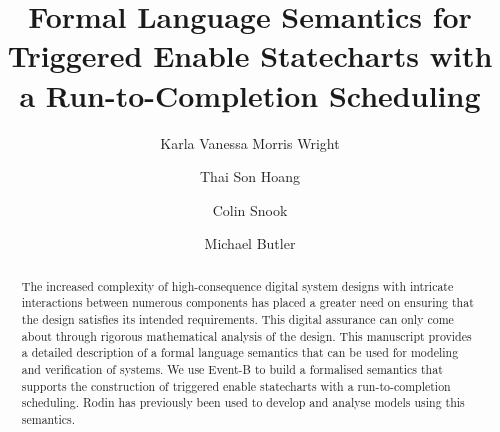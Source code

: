 \documentclass[runningheads]{llncs}
\begin{document}
%
\title{Formal Language Semantics for Triggered Enable Statecharts with a Run-to-Completion Scheduling}
%
%
\author{
Karla Vanessa Morris Wright \and
Thai Son Hoang  \and
Colin Snook \and
Michael Butler
}
%
%
%
%
\maketitle              %
%
\begin{abstract}
The increased complexity of high-consequence digital system designs with intricate interactions between numerous components has placed a greater need on ensuring that the design satisfies its intended requirements. This digital assurance can only come about through rigorous mathematical analysis of the design. This manuscript provides a detailed description of a formal language semantics that can be used for modeling and verification of systems. We use Event-B to build a formalised semantics that supports the construction of triggered enable statecharts with a run-to-completion scheduling. Rodin has previously been used to develop and analyse models using this semantics. 

\end{abstract}
%
%
%
\end{document}

